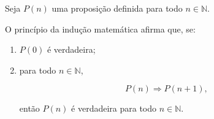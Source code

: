 \documentclass[../../main]{subfiles}
\begin{document}
\begin{defn}
	\label{def:matematica:logica-matematica:metodos-de-demonstracao:inducao-matematica}

	Seja \(P(n)\) uma proposição definida para todo
	\(n \in \mathbb{N}\).

	O princípio da indução matemática afirma que, se:

	\begin{enumerate}
		\item \(P(0)\) é verdadeira;

		\item para todo \(n \in \mathbb{N}\),

		      \[
			      P(n)
			      \Rightarrow
			      P(n+1),
		      \]

		      então \(P(n)\) é verdadeira para todo
		      \(n \in \mathbb{N}\).
	\end{enumerate}

\end{defn}
\end{document}
